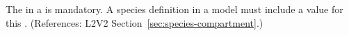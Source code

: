 The   in a \Species is mandatory.  A species
definition in a model must include a value for this .  (References:
L2V2 Section~\ref{sec:species-compartment}.)
